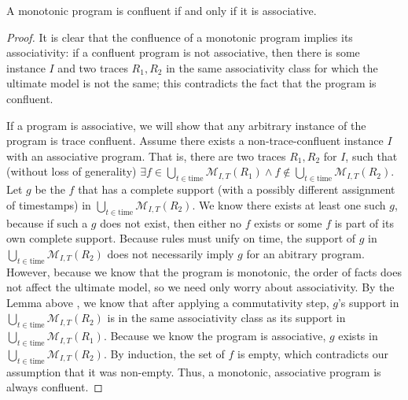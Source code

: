 \begin{lemma}
\label{lem:mon-assoc}
%
A monotonic \lang program is confluent if and only if it is associative.
%
\end{lemma}
%


\begin{proof}
%
It is clear that the confluence of a monotonic \lang program implies its
associativity: if a confluent \lang program is not associative, then there is
some instance $I$ and two traces $R_1, R_2$ in the same associativity class for
which the ultimate model is not the same; this contradicts the fact that the
program is confluent.

If a \lang program is associative, we will show that any arbitrary instance of
the \lang program is trace confluent.   Assume there exists a
non-trace-confluent \lang instance $I$ with an associative program.  That is,
there are two traces $R_1, R_2$ for $I$, such that (without loss of generality)
$\exists f \in \bigcup_{t \in \text{time}} \mathcal{M}_{I,T}(R_1) \land f
\not\in \bigcup_{t \in \text{time}} \mathcal{M}_{I,T}(R_2)$.  Let $g$ be the
$f$ that has a complete support (with a possibly different assignment of
timestamps) in $\bigcup_{t \in \text{time}} \mathcal{M}_{I,T}(R_2)$.  We know
there exists at least one such $g$, because if such a $g$ does not exist, then
either no $f$ exists or some $f$ is part of its own complete support.  Because
\lang rules must unify on time, the support of $g$ in $\bigcup_{t \in
\text{time}} \mathcal{M}_{I,T}(R_2)$ does not necessarily imply $g$ for an
abitrary program.  However, because we know that the program is monotonic, the
order of facts does not affect the ultimate model, so we need only worry about
associativity.  By the Lemma above , we know
that after applying a commutativity step, $g$'s support in $\bigcup_{t \in
\text{time}} \mathcal{M}_{I,T}(R_2)$ is in the same associativity class as its
support in $\bigcup_{t \in \text{time}} \mathcal{M}_{I,T}(R_1)$.  Because we
know the program is associative, $g$ exists in  $\bigcup_{t \in \text{time}}
\mathcal{M}_{I,T}(R_2)$.  By induction, the set of $f$ is empty, which
contradicts our assumption that it was non-empty.  Thus, a monotonic,
associative \lang program is always confluent.
%
\end{proof}

